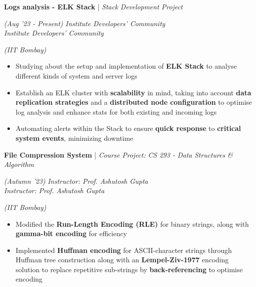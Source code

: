 \documentclass[10pt]{article}
\renewcommand{\subsection}[4]{
	\def\temp{#4}
	\vspace{2pt}
	{
		\large
		{\textbf{#1}} | {\sl #2} \filldate{#3}
		\ifx\temp\empty
		\else
		{
			\\[0.1em]
			\fontsize{11}{13.2}\selectfont
			\sl #4
		}
		\fi
	}
}
\newcommand{\filldate}[1]{\strut\hfill {\small \textit{(#1)}}}
\begin{document}
\subsection{Logs analysis - ELK Stack}{Stack Development Project}{Aug '23 - Present}{\textit{Institute Developers' Community}}\filldate{IIT Bombay}
\begin{itemize}
        \item Studying about the setup and implementation of\textbf{ ELK Stack} to analyse different kinds of system and server logs
	\item  Establish an ELK cluster with \textbf{scalability} in mind, taking into account \textbf{data replication strategies} and a \textbf{distributed node configuration} to optimise log analysis and enhance stats for both existing and incoming logs
        \item Automating alerts within the Stack to ensure \textbf{quick response} to \textbf{critical system events}, minimizing downtime
 \end{itemize}
\newpage
{}

    
\subsection{File Compression System}{Course Project: CS 293 - Data Structures \& Algorithm}{Autumn '23}{\textit{Instructor: Prof. Ashutosh Gupta}}\filldate{IIT Bombay}
\begin{itemize}
        \item Modified the \textbf{Run-Length Encoding (RLE)} for binary strings, along with \textbf{gamma-bit encoding} for efficiency
	\item Implemented \textbf{Huffman encoding} for ASCII-character strings through Huffman tree construction along with an \textbf{Lempel-Ziv-1977 }encoding solution to replace repetitive sub-strings by \textbf{back-referencing} to optimise encoding
 
\end{itemize}
\end{document}
